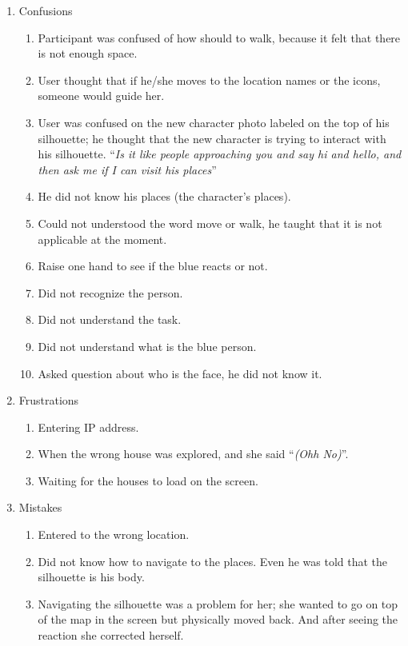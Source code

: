 \begin{enumerate}
\item Confusions 

\begin{enumerate}
\item  Participant was confused of how should to walk, because it felt that there is not enough space. 
\item  User thought that if he/she moves to the location names or the icons, someone would guide her.
\item  User was confused on the new character photo labeled on the top of his silhouette; he thought that the new character is trying to interact with his silhouette. ``\emph{Is it like people approaching you and say hi and hello, and then ask me if I can visit his places}''
\item  He did not know his places (the character’s places).
\item  Could not understood the word move or walk, he taught that it is not applicable at the moment.
\item  Raise one hand to see if the blue reacts or not.
\item  Did not recognize the person.
\item  Did not understand the task.
\item  Did not understand what is the blue person.
\item  Asked question about who is the face, he did not know it.

\end{enumerate}

\item Frustrations
\begin{enumerate}
\item  Entering IP address.
\item  When the wrong house was explored, and she said ``\emph{(Ohh No)}''.
\item  Waiting for the houses to load on the screen.
\end{enumerate}

\item Mistakes
\begin{enumerate}
\item  Entered to the wrong location.
\item  Did not know how to navigate to the places. Even he was told that the silhouette is his body.
\item  Navigating the silhouette was a problem for her; she wanted to go on top of the map in the screen but physically moved back. And after seeing the reaction she corrected herself.
\end{enumerate}


\end{enumerate}
